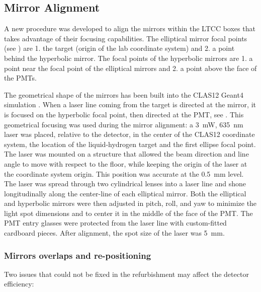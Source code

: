 
\subsection{Mirror Alignment}\label{sec:mirrorAlignment}

A new procedure was developed to align the mirrors within the LTCC boxes that takes advantage of their focusing capabilities.
The elliptical mirror focal points (see ) are 1. the target (origin of the lab coordinate system)
and 2. a point behind the hyperbolic mirror. The focal points of the hyperbolic mirrors are 1. a point near the focal point of the elliptical mirrors and
2. a point above the face of the PMTs.

The geometrical shape of the mirrors has been built into the CLAS12 Geant4 simulation \cite{sim-nim}.
When a laser line coming from the target is directed at the mirror,
it is focused on the hyperbolic focal point, then directed at the PMT, see .
This geometrical focusing was used during the mirror alignment: a 3~mW, 635~nm laser was placed, relative to the
detector,
in the center of the CLAS12 coordinate system, the location of the liquid-hydrogen target and the first ellipse focal point.
The laser was mounted on a structure that allowed the beam direction and line angle to move with respect to the floor,
while keeping the origin of the laser at the coordinate system origin.
This position was accurate at the 0.5~mm level. The laser was spread through two cylindrical lenses into a laser line
and shone
longitudinally along the center-line of each elliptical mirror. Both the elliptical and hyperbolic mirrors were then
adjusted in pitch, roll, and yaw to minimize the light spot dimensions and to center it in the middle of the face of the PMT.
The PMT entry glasses were protected from the laser line with custom-fitted cardboard pieces. After alignment, the spot size of the laser was 5~mm.

\subsubsection{Mirrors overlaps and re-positioning}\label{sec:possibleInefficiency}
Two issues that could not be fixed in the refurbishment may affect the detector efficiency:


